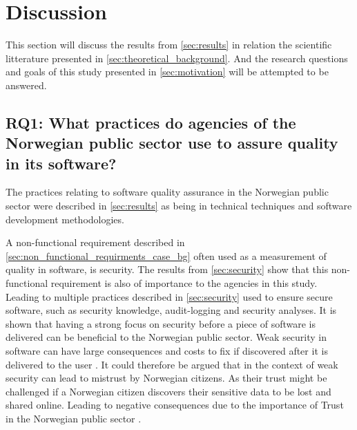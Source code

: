 \chapter{Discussion} \label{sec:discussion}
This section will discuss the results from \autoref{sec:results} in relation the scientific litterature presented in \autoref{sec:theoretical_background}. And the research questions and goals of this study presented in \autoref{sec:motivation} will be attempted to be answered.

\section{RQ1: What practices do agencies of the Norwegian public sector use to assure quality in its software?}
The practices relating to software quality assurance in the Norwegian public sector were described in \autoref{sec:results} as being in technical techniques and software development methodologies.

A non-functional requirement described in \autoref{sec:non_functional_requirments_case_bg} often used as a measurement of quality in software, is security. The results from \autoref{sec:security} show that this non-functional requirement is also of importance to the agencies in this study. Leading to multiple practices described in \autoref{sec:security} used to ensure secure software, such as security knowledge, audit-logging and security analyses. It is shown that having a strong focus on security before a piece of software is delivered can be beneficial to the Norwegian public sector. Weak security in software can have large consequences and costs to fix if discovered after it is delivered to the user \cite{csw_2011}. It could therefore be argued that in the context of weak security can lead to mistrust by Norwegian citizens. As their trust might be challenged if a Norwegian citizen discovers their sensitive data to be lost and shared online. Leading to negative consequences due to the importance of Trust in the Norwegian public sector \cite{oecd_2022}.


